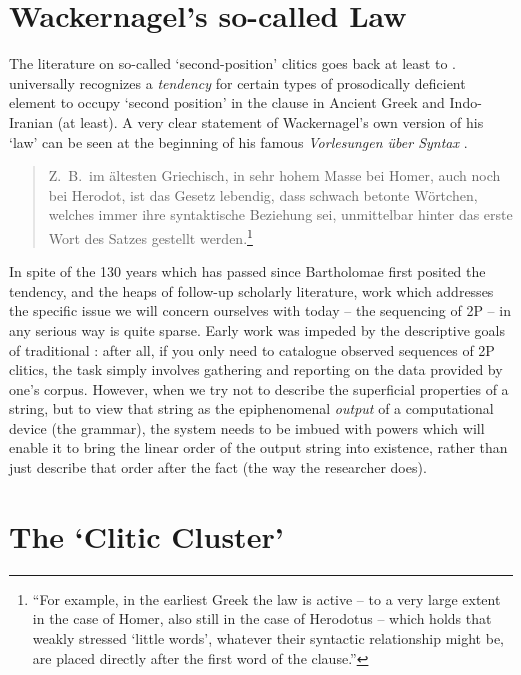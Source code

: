 \documentclass[output=paper,
modfonts
]{LSP/langsci}
\begin{document}
\section{Wackernagel's so-called Law}

The literature on so-called `second-position' clitics goes back at least to
\citet{bartholomae1886}.  universally recognizes a \textit{tendency} for certain types of prosodically
deficient element to occupy `second position' in the clause in Ancient Greek and
Indo-Iranian (at least). A very clear statement of Wackernagel's
own version of his `law' can be seen at the beginning of his famous \textit{Vorlesungen
über Syntax} \citep[7]{wackernagel1920}.
 

\begin{quote}
\noindent Z.\ B.\ im ältesten Griechisch, in sehr hohem Masse bei Homer,
auch noch bei Herodot, ist das Gesetz lebendig, dass schwach betonte Wört\-chen,
welches immer ihre syntaktische Beziehung sei, unmittelbar hinter das
erste Wort des Satzes gestellt werden.\footnote{``For example, in the earliest Greek the law is active -- to a very
large extent in the case of Homer, also still in the case of Herodotus -- which holds that weakly stressed `little words', whatever their syntactic relationship might
be, are placed directly after the first word of the clause.''}
\end{quote}

\noindent In spite of the 130 years which has passed since Bartholomae first posited the tendency, 
and the heaps of follow-up scholarly literature, work which addresses the specific issue we will
concern ourselves with today -- the sequencing of 2P  -- in any serious way is quite sparse.
Early work was impeded by the descriptive goals of traditional : after all,
if you only need to catalogue observed sequences of 2P clitics, the task simply involves gathering
and reporting on the data provided by one's corpus. However, when we try not to describe the superficial 
properties of a string,
but to view that string as the epiphenomenal \textit{output} of a computational device (the grammar),
the system needs to be imbued with powers which will enable it to bring the linear
order of the output string into existence, rather than just describe that order after the fact (the way
the researcher does). 


\section{The `Clitic Cluster'}
\end{document}
